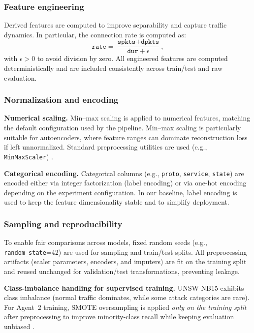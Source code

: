 \documentclass[conference]{IEEEtran}
\begin{document}
\subsubsection{Feature engineering}
Derived features are computed to improve separability and capture traffic dynamics. In particular, the connection rate is computed as:
\begin{equation}
\texttt{rate} = \frac{\texttt{spkts}+\texttt{dpkts}}{\texttt{dur}+\epsilon},
\end{equation}
with $\epsilon>0$ to avoid division by zero. All engineered features are computed deterministically and are included consistently across train/test and raw evaluation.

\subsubsection{Normalization and encoding}
\textbf{Numerical scaling.} Min--max scaling is applied to numerical features, matching the default configuration used by the pipeline. Min--max scaling is particularly suitable for autoencoders, where feature ranges can dominate reconstruction loss if left unnormalized. Standard preprocessing utilities are used (e.g., \texttt{MinMaxScaler}) \cite{Pedregosa2011Scikit}.

\textbf{Categorical encoding.} Categorical columns (e.g., \texttt{proto}, \texttt{service}, \texttt{state}) are encoded either via integer factorization (label encoding) or via one-hot encoding depending on the experiment configuration. In our baseline, label encoding is used to keep the feature dimensionality stable and to simplify deployment.

\subsubsection{Sampling and reproducibility}
To enable fair comparisons across models, fixed random seeds (e.g., \texttt{random\_state}=42) are used for sampling and train/test splits. All preprocessing artifacts (scaler parameters, encoders, and imputers) are fit on the training split and reused unchanged for validation/test transformations, preventing leakage.


\textbf{Class-imbalance handling for supervised training.} UNSW-NB15 exhibits class imbalance (normal traffic dominates, while some attack categories are rare). For Agent~2 training, SMOTE oversampling is applied \emph{only on the training split} after preprocessing to improve minority-class recall while keeping evaluation unbiased \cite{Chawla2002SMOTE}.
\end{document}
